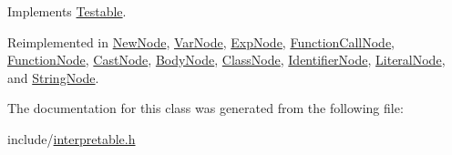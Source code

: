 Implements \hyperlink{classTestable_aa10ae4ed84c5d9b36bd69be37790e6ba}{Testable}.



Reimplemented in \hyperlink{classNewNode_a9be504d069e8a5d4ea13b4767a3c792a}{New\+Node}, \hyperlink{classVarNode_afaca674319775ae5e8a4fb0e5ec7b59f}{Var\+Node}, \hyperlink{classExpNode_a8fb8302d5ce438a9ad0f58161be2a1c9}{Exp\+Node}, \hyperlink{classFunctionCallNode_a5a7f576984942e2e39057d716d8a5547}{Function\+Call\+Node}, \hyperlink{classFunctionNode_a1f020e7ea0181b3ce16ad2ef8426f773}{Function\+Node}, \hyperlink{classCastNode_a19fa03c324a6dcbadac32965a86afb3e}{Cast\+Node}, \hyperlink{classBodyNode_a80e75b0ab6c388c34a82bdce63fdc7bb}{Body\+Node}, \hyperlink{classClassNode_ac5147024d81a0c6841e9453025e4f988}{Class\+Node}, \hyperlink{classIdentifierNode_a1459965d8f22ade30cb78b2a1d60dd07}{Identifier\+Node}, \hyperlink{classLiteralNode_af55e4e5e668c9be666c0b6c24c3918f9}{Literal\+Node}, and \hyperlink{classStringNode_a3836ad2a1bb6f86cd52663653a65bad8}{String\+Node}.



The documentation for this class was generated from the following file\+:\begin{DoxyCompactItemize}
\item 
include/\hyperlink{interpretable_8h}{interpretable.\+h}\end{DoxyCompactItemize}
